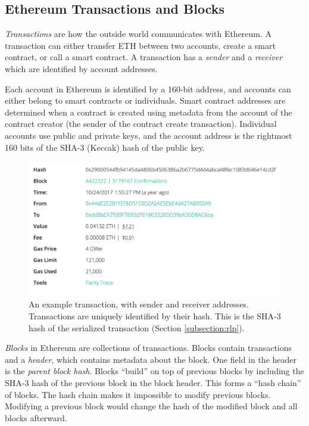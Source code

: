 \documentclass[12pt]{article}
\begin{document}
\subsection{Ethereum Transactions and Blocks}

\emph{Transactions} are how the outside world communicates with Ethereum. A transaction can either transfer ETH between two accounts, create a smart contract, or call a smart contract. A transaction has a \emph{sender} and a \emph{receiver} which are identified by account addresses.

Each account in Ethereum is identified by a 160-bit address, and accounts can either belong to smart contracts or individuals. Smart contract addresses are determined when a contract is created using metadata from the account of the contract creator (the sender of the contract create transaction). Individual accounts use public and private keys, and the account address is the rightmost 160 bits of the SHA-3 (Keccak) hash of the public key. %

\begin{figure}[H]
  \centering
  \includegraphics[width=\textwidth]{../figures/background/transactions/example_transaction.png}
  \caption{An example transaction, with sender and receiver addresses. Transactions are uniquely identified by their hash. This is the SHA-3 hash of the serialized transaction (Section \ref{subsection:rlp}).}
\end{figure}

\emph{Blocks} in Ethereum are collections of transactions. Blocks contain transactions and a \emph{header}, which contains metadata about the block. One field in the header is the \emph{parent block hash}. Blocks ``build'' on top of previous blocks by including the SHA-3 hash of the previous block in the block header. This forms a ``hash chain'' of blocks. The hash chain makes it impossible to modify previous blocks. Modifying a previous block would change the hash of the modified block and all blocks afterward.
\end{document}
